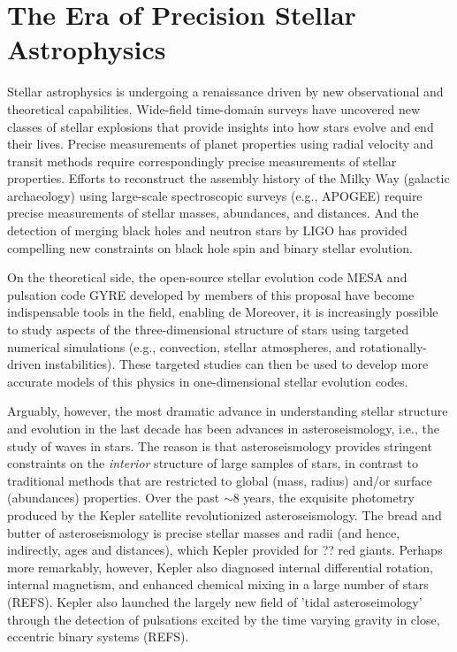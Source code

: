 \section{The Era of Precision Stellar Astrophysics}

Stellar astrophysics is undergoing a renaissance driven by new observational and theoretical capabilities. Wide-field time-domain surveys have uncovered new classes of stellar explosions that provide insights into how stars evolve and end their lives.  Precise measurements of planet properties using radial velocity and transit methods require correspondingly precise measurements of stellar properties. Efforts to reconstruct the assembly history of the Milky Way (galactic archaeology) using large-scale spectroscopic surveys (e.g., APOGEE) require precise measurements of stellar masses, abundances, and distances. And the detection of merging black holes and neutron stars by LIGO has provided compelling new constraints on black hole spin and binary stellar evolution.   

On the theoretical side, the open-source stellar evolution code MESA and pulsation code GYRE developed by members of this proposal have become indispensable tools in the field, enabling de   Moreover, it is increasingly possible to study aspects of the three-dimensional structure of stars using targeted numerical simulations (e.g., convection, stellar atmospheres, and rotationally-driven instabilities).  These targeted studies can then be used to develop more accurate models of this physics in one-dimensional stellar evolution codes.

Arguably, however, the most dramatic advance in understanding stellar structure and evolution in the last decade has been advances in asteroseismology, i.e., the study of waves in stars.   The reason is that asteroseismology provides stringent constraints on the {\em interior} structure of large samples of stars, in contrast to traditional methods that are restricted to global (mass, radius) and/or surface (abundances) properties.   Over the past $\sim 8$ years, the exquisite photometry produced by the Kepler satellite revolutionized asteroseismology.  The bread and butter of asteroseismology is precise stellar masses and radii (and hence, indirectly, ages and distances), which Kepler provided for ?? red giants.   Perhaps more remarkably, however, Kepler also diagnosed internal differential rotation, internal magnetism, and enhanced chemical mixing in a large number of stars (REFS).  Kepler also launched the largely new field of 'tidal asteroseimology' through the detection of pulsations excited by the time varying gravity in close, eccentric binary systems (REFS). 

